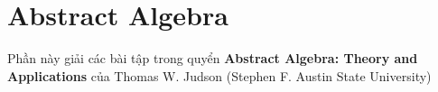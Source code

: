 \chapter{Abstract Algebra}

Phần này giải các bài tập trong quyển \textbf{Abstract Algebra: Theory and Applications} của Thomas W. Judson (Stephen F. Austin State University)




